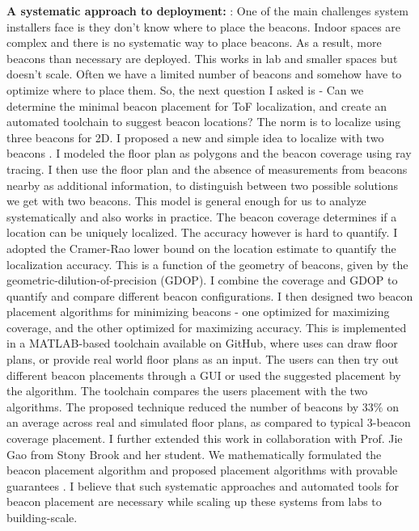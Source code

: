\documentclass[10pt]{article}
\begin{document}
\textbf{A systematic approach to deployment: }:
One of the main challenges system installers face is they don't know where to place the beacons. Indoor spaces are complex and there is no systematic way to place beacons. 
As a result, more beacons than necessary are deployed. 
This works in lab and smaller spaces but doesn't scale. Often we have a limited number of beacons and somehow have to optimize where to place them. %
So, the next question I asked is - Can we determine the minimal beacon placement for ToF localization, and create an automated toolchain to suggest beacon locations? The norm is to localize using three beacons for 2D.  I proposed a new and simple idea to localize with two beacons \cite{rajagopal2016beacon}. I modeled the floor plan as polygons and the beacon coverage using ray tracing. I then use the floor plan and the absence of measurements from beacons nearby as additional information, to distinguish between two possible solutions we get with two beacons. This model is general enough for us to analyze systematically and also works in practice. The beacon coverage determines if a location can be uniquely localized. The accuracy however is hard to quantify. I adopted the Cramer-Rao lower bound on the location estimate to quantify the localization accuracy. This is a function of the geometry of beacons, given by the geometric-dilution-of-precision (GDOP).  %
I combine the coverage and GDOP to quantify and compare different beacon configurations. I then designed two beacon placement algorithms for minimizing beacons - one optimized for maximizing coverage, and the other optimized for maximizing accuracy. This is implemented in a MATLAB-based toolchain available on GitHub, where uses can draw floor plans, or provide real world floor plans as an input. The users can then try out different beacon placements through a GUI or used the suggested placement by the algorithm. The toolchain compares the users placement with the two algorithms. The proposed technique reduced the number of beacons by $33\%$ on an average across real and simulated floor plans, as compared to typical 3-beacon coverage placement. I further extended this work in collaboration with Prof. Jie Gao from Stony Brook and her student. We mathematically formulated the beacon placement algorithm and proposed placement algorithms with provable guarantees \cite{beaconplacementtheory}. I believe that such systematic approaches and automated tools for beacon placement are necessary while scaling up these systems from labs to building-scale. \\
\end{document}
